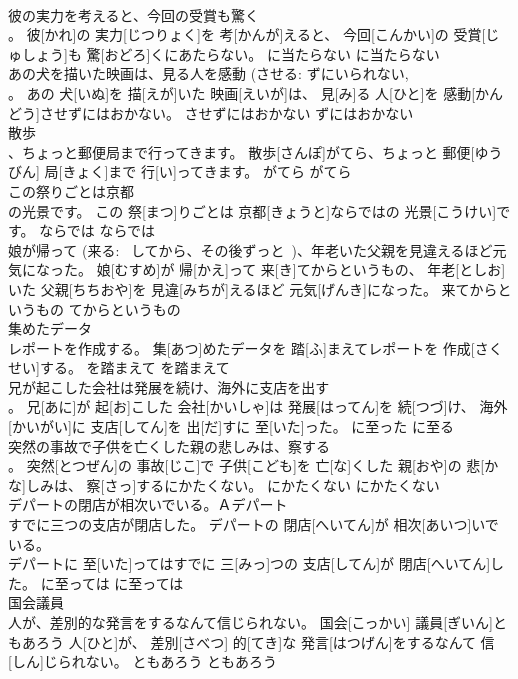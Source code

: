 \documentclass[8pt]{extreport}
\begin{document}
\begin{CJK}{UTF8}{min}
\\	彼の実力を考えると、今回の受賞も驚く 
\\	。	彼[かれ]の 実力[じつりょく]を 考[かんが]えると、 今回[こんかい]の 受賞[じゅしょう]も 驚[おどろ]くにあたらない。	に当たらない	に当たらない	
\\	あの犬を描いた映画は、見る人を感動 (させる: ずにいられない, 
\\	。	あの 犬[いぬ]を 描[えが]いた 映画[えいが]は、 見[み]る 人[ひと]を 感動[かんどう]させずにはおかない。	させずにはおかない	ずにはおかない	
\\	散歩 
\\	、ちょっと郵便局まで行ってきます。	散歩[さんぽ]がてら、ちょっと 郵便[ゆうびん] 局[きょく]まで 行[い]ってきます。	がてら	がてら	
\\	この祭りごとは京都 
\\	の光景です。	この 祭[まつ]りごとは 京都[きょうと]ならではの 光景[こうけい]です。	ならでは	ならでは	
\\	娘が帰って (来る: ~してから、その後ずっと~)、年老いた父親を見違えるほど元気になった。	娘[むすめ]が 帰[かえ]って 来[き]てからというもの、 年老[としお]いた 父親[ちちおや]を 見違[みちが]えるほど 元気[げんき]になった。	来てからというもの	てからというもの	
\\	集めたデータ 
\\	レポートを作成する。	集[あつ]めたデータを 踏[ふ]まえてレポートを 作成[さくせい]する。	を踏まえて	を踏まえて	
\\	兄が起こした会社は発展を続け、海外に支店を出す 
\\	。	兄[あに]が 起[お]こした 会社[かいしゃ]は 発展[はってん]を 続[つづ]け、 海外[かいがい]に 支店[してん]を 出[だ]すに 至[いた]った。	に至った	に至る	
\\	突然の事故で子供を亡くした親の悲しみは、察する 
\\	。	突然[とつぜん]の 事故[じこ]で 子供[こども]を 亡[な]くした 親[おや]の 悲[かな]しみは、 察[さっ]するにかたくない。	にかたくない	にかたくない	
\\	デパートの閉店が相次いでいる。Ａデパート 
\\	すでに三つの支店が閉店した。	デパートの 閉店[へいてん]が 相次[あいつ]いでいる。 
\\	[えい]デパートに 至[いた]ってはすでに 三[みっ]つの 支店[してん]が 閉店[へいてん]した。	に至っては	に至っては	
\\	国会議員 
\\	人が、差別的な発言をするなんて信じられない。	国会[こっかい] 議員[ぎいん]ともあろう 人[ひと]が、 差別[さべつ] 的[てき]な 発言[はつげん]をするなんて 信[しん]じられない。	ともあろう	ともあろう	

\end{CJK}
\end{document}
